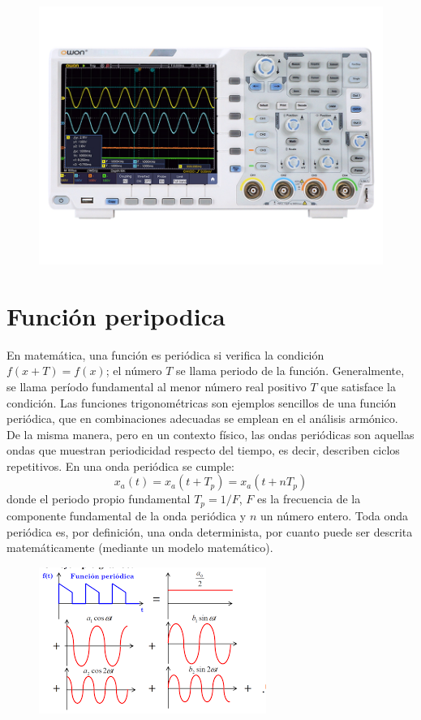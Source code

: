 \documentclass[a4paper,12pt]{report}
\begin{document}
\begin{figure}[H]
\centering
\includegraphics[scale=0.35]{osciloscopio.jpg}
\end{figure}
\section{Función peripodica}
En matemática, una función es periódica si verifica la condición $f(x+T)=f(x)$; el número $T$ se llama periodo de la función. Generalmente, se llama período fundamental al menor número real positivo $T$ que satisface la condición. Las funciones trigonométricas son ejemplos sencillos de una función periódica, que en combinaciones adecuadas se emplean en el análisis armónico. De la misma manera, pero en un contexto físico, las ondas periódicas son aquellas ondas que muestran periodicidad respecto del tiempo, es decir, describen ciclos repetitivos. En una onda periódica se cumple:
$$
x_{a}(t) = x_{a}(t+T_{p}) = x_{a}(t+nT_{p})
$$
donde el periodo propio fundamental $T_{p} = 1/F$, $F$ es la frecuencia de la componente fundamental de la onda periódica y $n$ un número entero. Toda onda periódica es, por definición, una onda determinista, por cuanto puede ser descrita matemáticamente (mediante un modelo matemático).
\begin{figure}[H]
\centering
\includegraphics[scale=1.1]{periodica.png}
\end{figure}
\end{document}
